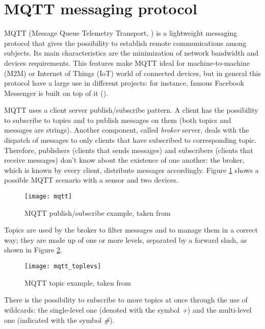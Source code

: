 \section{MQTT messaging protocol}\label{mqtt}

MQTT (Message Queue Telemetry Transport, \cite{banks2014mqtt}) is a light\-weight messaging protocol that gives the possibility to establish remote communications among subjects. Its main characteristics are the minimization of network bandwidth and devices requirements. This features make MQTT ideal for machine-to-machine (M2M) or Internet of Things (IoT) world of connected devices, but in general this protocol have a large use in different projects: for instance, famous Facebook Messenger is built on top of it (\cite{zhang2011building}).

MQTT uses a client server publish\slash{}subscribe pattern. A client has the possibility to subscribe to topics and to publish messages on them (both topics and messages are strings). Another component, called \textit{broker} server, deals with the dispatch of messages to only clients that have subscribed to corresponding topic. Therefore, publishers (clients that sends messages) and subscribers (clients that receive messages) don't know about the existence of one another: the broker, which is known by every client, distribute messages accordingly. Figure \ref{fig::mqtt_example} shows a possible MQTT scenario with a sensor and two devices.

\begin{figure}[htb]

    \centering
    \texttt{[image: mqtt]}
    \caption{MQTT publish/subscribe example, taken from \cite{site:hivemq}}
    \label{fig::mqtt_example}

\end{figure}

Topics are used by the broker to filter messages and to manage them in a correct way; they are made up of one or more levels, separated by a forward slash, as shown in Figure \ref{fig::topic}.

\begin{figure}[hb]

    \centering
    \texttt{[image: mqtt\_toplevs]}
    \caption{MQTT topic example, taken from \cite{site:hivemq}}
    \label{fig::topic}

\end{figure}

There is the possibility to subscribe to more topics at once through the use of wildcards: the single-level one (denoted with the symbol \textit{+}) and the multi-level one (indicated with the symbol \textit{\#}).

